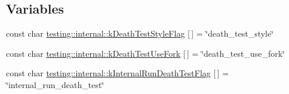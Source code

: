 \subsection*{Variables}
\begin{DoxyCompactItemize}
\item 
const char \mbox{\hyperlink{namespacetesting_1_1internal_a8be730bac57cfd5a92d4aeea57ad499e}{testing\+::internal\+::k\+Death\+Test\+Style\+Flag}} \mbox{[}$\,$\mbox{]} = \char`\"{}death\+\_\+test\+\_\+style\char`\"{}
\item 
const char \mbox{\hyperlink{namespacetesting_1_1internal_aefe557a4dfcfd1cb9c7046a26b3c28bb}{testing\+::internal\+::k\+Death\+Test\+Use\+Fork}} \mbox{[}$\,$\mbox{]} = \char`\"{}death\+\_\+test\+\_\+use\+\_\+fork\char`\"{}
\item 
const char \mbox{\hyperlink{namespacetesting_1_1internal_abdcf0e0c1b0ec4fbb1e004c3805997d0}{testing\+::internal\+::k\+Internal\+Run\+Death\+Test\+Flag}} \mbox{[}$\,$\mbox{]} = \char`\"{}internal\+\_\+run\+\_\+death\+\_\+test\char`\"{}
\end{DoxyCompactItemize}

